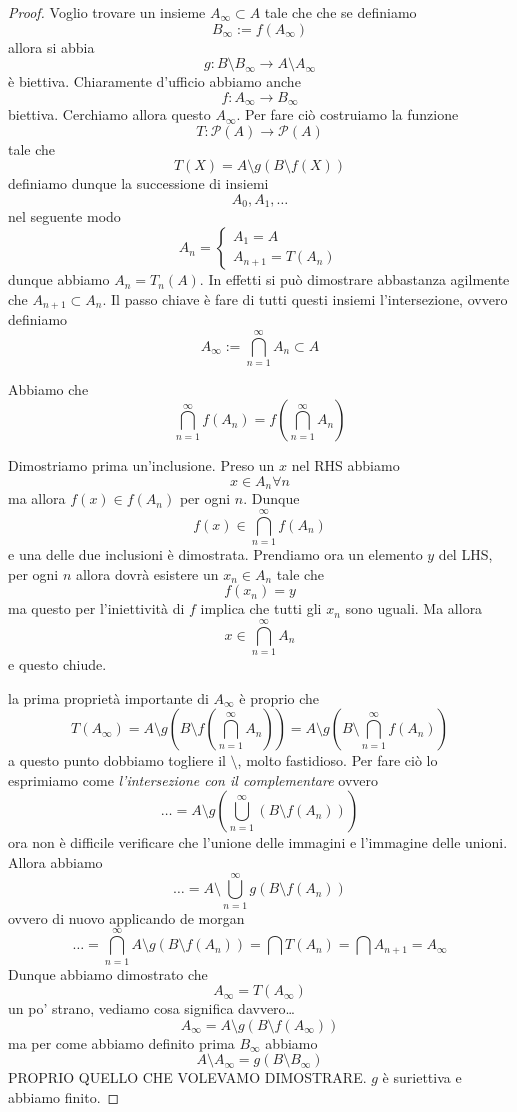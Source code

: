 \documentclass[11pt]{scrartcl}
\newcommand{\parti}{\mathcal{P}}
\begin{document}
  \begin{proof}
  	Voglio trovare un insieme $A_\infty\subset A$ tale che che se definiamo 
  	$$B_\infty:=f(A_\infty)$$
  	allora si abbia
  	$$g:B\setminus B_\infty \to A\setminus A_\infty$$ 
  	è biettiva. Chiaramente d'ufficio abbiamo anche
  	$$f:A_\infty \to B_\infty$$
  	biettiva. Cerchiamo allora questo $A_\infty$. Per fare ciò costruiamo la funzione
  	$$T:\parti(A)\to \parti(A)$$
  	tale che
  	$$T\left(X\right)=A\setminus g(B\setminus f(X))$$
  	definiamo dunque la successione di insiemi
  	$$A_0,A_1,\dots$$
  	nel seguente modo
  	$$A_n=
  	\begin{cases}
  		A_1=A \\
  		A_{n+1}=T(A_n)
  	\end{cases}
  	$$
  	dunque abbiamo $A_n=T_n(A)$. In effetti si può dimostrare abbastanza agilmente che $A_{n+1}\subset A_n$. Il passo chiave è fare di tutti questi insiemi l'intersezione, ovvero definiamo
  	$$A_\infty:=\bigcap_{n=1}^\infty A_n \subset A$$
  	\begin{claim}
  		Abbiamo che
  		$$\bigcap_{n=1}^\infty f(A_n)=f\left(\bigcap_{n=1}^\infty A_n\right)$$
  	\end{claim}
  	\begin{subproof}[Sottodimostrazione]
  		Dimostriamo prima un'inclusione. Preso un $x$ nel RHS abbiamo
  		$$x\in A_n\forall n$$
  		ma allora $f(x)\in f(A_n)$ per ogni $n$. Dunque 
  		$$f(x)\in \bigcap_{n=1}^\infty f(A_n)$$
  		e una delle due inclusioni è dimostrata. Prendiamo ora un elemento $y$ del LHS, per ogni $n$ allora dovrà esistere un $x_n\in A_n$ tale che
  		$$f(x_n)=y$$
  		ma questo per l'iniettività di $f$ implica che tutti gli $x_n$ sono uguali. Ma allora 
  		$$x\in \bigcap_{n=1}^\infty A_n$$
  		e questo chiude.
  	\end{subproof}
  	la prima proprietà importante di $A_\infty$ è proprio che
  	$$T(A_\infty)=A\setminus g\left(B\setminus f\left(\bigcap_{n=1}^\infty A_n\right)\right)=A\setminus g\left(B\setminus \bigcap_{n=1}^\infty f(A_n)\right)$$
  	a questo punto dobbiamo togliere il $\setminus$, molto fastidioso. Per fare ciò lo esprimiamo come \textit{l'intersezione con il complementare} ovvero
  	$$\dots = A\setminus g\left(\bigcup_{n=1}^\infty\left(B\setminus f(A_n)\right)\right)$$
  	ora non è difficile verificare che l'unione delle immagini e l'immagine delle unioni. Allora abbiamo
  	$$\dots=A\setminus \bigcup_{n=1}^\infty g\left(B\setminus f(A_n)\right)$$
  	ovvero di nuovo applicando de morgan
  	$$\dots = \bigcap_{n=1}^\infty A\setminus g\left(B\setminus f(A_n)\right)=\bigcap T(A_n)=\bigcap A_{n+1}=A_\infty$$
  	Dunque abbiamo dimostrato che 
  	$$A_\infty=T(A_\infty)$$
  	un po' strano, vediamo cosa significa davvero\dots
  	$$A_\infty=A\setminus g(B\setminus f(A_\infty))$$
  	ma per come abbiamo definito prima $B_\infty$ abbiamo
  	$$A\setminus A_\infty=g(B\setminus B_\infty)$$
  	PROPRIO QUELLO CHE VOLEVAMO DIMOSTRARE. $g$ è suriettiva e abbiamo finito.
  \end{proof}
  
\end{document}
